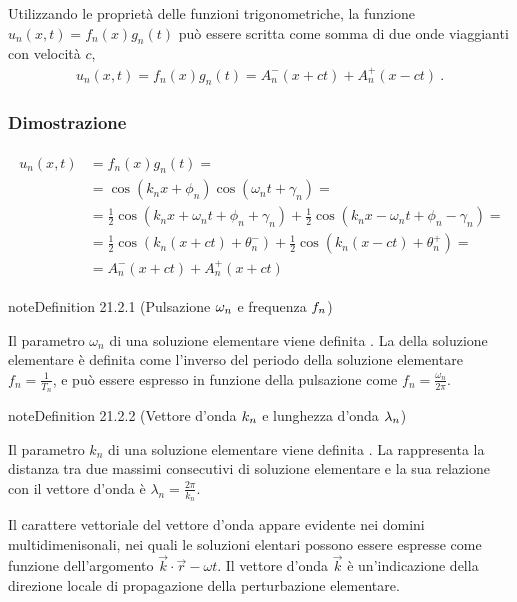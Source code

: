 \documentclass[letterpaper,10pt,italian]{jupyterBook}
\begin{document}
\sphinxAtStartPar
{} Utilizzando le proprietà delle funzioni trigonometriche, la funzione \(u_n(x,t) = f_{n}(x) g_n(t)\) può essere scritta come somma di due onde viaggianti con velocità \(c\),
\begin{equation}\label{equation:ch/waves/phenomena:travelling-waves}
\begin{split}u_n(x,t) = f_n(x) g_n(t) = A_n^{-}(x+ct) + A_n^{+}(x-ct) \ .\end{split}
\end{equation}\subsubsection*{Dimostrazione}
\begin{equation*}
\begin{split}\begin{aligned}
u_n(x,t) 
  & = f_n(x) g_n(t) = \\
  & = \cos(k_n x + \phi_n) \cos (\omega_n t + \gamma_n) = \\
  & = \frac{1}{2} \cos(k_n x + \omega_n t + \phi_n + \gamma_n) + \frac{1}{2} \cos(k_n x - \omega_n t + \phi_n - \gamma_n) = \\
  & = \frac{1}{2} \cos(k_n( x + c t) + \theta^-_n) + \frac{1}{2} \cos(k_n( x - c t) + \theta^+_n) = \\
  & = A_n^-(x+ct) + A_n^{+}(x+ct)
\end{aligned}\end{split}
\end{equation*}\label{ch/waves/phenomena:wave-frequency}
\begin{sphinxadmonition}{note}{Definition 21.2.1 (Pulsazione \protect\(\omega_n\protect\) e frequenza \protect\(f_n\protect\))}



\sphinxAtStartPar
Il parametro \(\omega_n\) di una soluzione elementare viene definita . La  della soluzione elementare è definita come l’inverso del periodo della soluzione elementare \(f_n = \frac{1}{T_n}\), e può essere espresso in funzione della pulsazione come \(f_n = \frac{\omega_n}{2\pi}\).
\end{sphinxadmonition}
\label{ch/waves/phenomena:wave-length}
\begin{sphinxadmonition}{note}{Definition 21.2.2 (Vettore d’onda \protect\(k_n\protect\) e lunghezza d’onda \protect\(\lambda_n\protect\))}



\sphinxAtStartPar
Il parametro \(k_n\) di una soluzione elementare viene definita . La  rappresenta la distanza tra due massimi consecutivi di soluzione elementare e la sua relazione con il vettore d’onda è \(\lambda_n = \frac{2 \pi }{k_n}\).

\sphinxAtStartPar
Il carattere vettoriale del vettore d’onda appare evidente nei domini multi\sphinxhyphen{}dimenisonali, nei quali le soluzioni elentari possono essere espresse come funzione dell’argomento \(\vec{k} \cdot \vec{r} - \omega t\). Il vettore d’onda \(\vec{k}\) è un’indicazione della direzione locale di propagazione della perturbazione elementare.
\end{sphinxadmonition}
\end{document}
